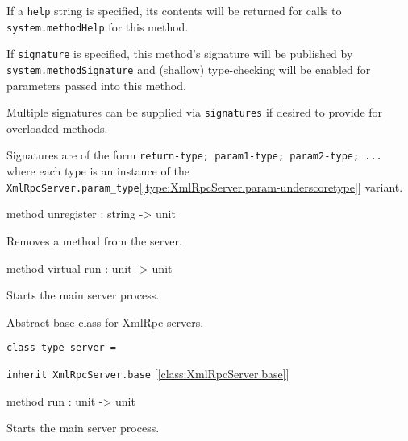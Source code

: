 \documentclass[11pt]{article}
\begin{document}
\begin{ocamldocobjectend}
\begin{ocamldocdescription}
      If a {\tt{help}} string is specified, its contents will be returned for
      calls to {\tt{system.methodHelp}} for this method.


      If {\tt{signature}} is specified, this method's signature will be published
      by {\tt{system.methodSignature}} and (shallow) type-checking will be enabled
      for parameters passed into this method.


      Multiple signatures can be supplied via {\tt{signatures}} if desired to
      provide for overloaded methods.


      Signatures are of the form {\tt{return-type; param1-type; param2-type; ...}}
      where each type is an instance of the {\tt{XmlRpcServer.param\_type}}[\ref{type:XmlRpcServer.param-underscoretype}] variant.


\end{ocamldocdescription}


\label{method:XmlRpcServer.base.unregister}\begin{ocamldoccode}
method unregister : string -> unit
\end{ocamldoccode}
\begin{ocamldocdescription}
Removes a method from the server.


\end{ocamldocdescription}


\label{method:XmlRpcServer.base.run}\begin{ocamldoccode}
method virtual run : unit -> unit
\end{ocamldoccode}
\begin{ocamldocdescription}
Starts the main server process.


\end{ocamldocdescription}
\end{ocamldocobjectend}


\begin{ocamldocdescription}
Abstract base class for XmlRpc servers.


\end{ocamldocdescription}




\begin{ocamldoccode}
{\tt{class type server = }}\end{ocamldoccode}
\label{classtype:XmlRpcServer.server}

\begin{ocamldocobjectend}


{\tt{inherit XmlRpcServer.base}} [\ref{class:XmlRpcServer.base}]

\label{method:XmlRpcServer.server.run}\begin{ocamldoccode}
method run : unit -> unit
\end{ocamldoccode}
\begin{ocamldocdescription}
Starts the main server process.


\end{ocamldocdescription}
\end{ocamldocobjectend}
\end{document}
